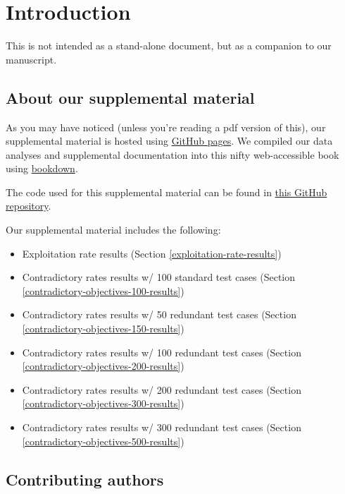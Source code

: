 \documentclass[
]{book}
\providecommand{\tightlist}{%
  \setlength{\itemsep}{0pt}\setlength{\parskip}{0pt}}
\begin{document}
\hypertarget{introduction}{%
\chapter{Introduction}\label{introduction}}

This is not intended as a stand-alone document, but as a companion to our manuscript.

\hypertarget{about-our-supplemental-material}{%
\section{About our supplemental material}\label{about-our-supplemental-material}}

As you may have noticed (unless you're reading a pdf version of this), our supplemental material is hosted using \href{https://pages.github.com/}{GitHub pages}.
We compiled our data analyses and supplemental documentation into this nifty web-accessible book using \href{https://bookdown.org}{bookdown}.

The code used for this supplemental material can be found in \href{https://github.com/jgh9094/GPTP-2024-Lexicase-Analysis}{this GitHub repository}.

Our supplemental material includes the following:

\begin{itemize}
\tightlist
\item
  Exploitation rate results (Section \ref{exploitation-rate-results})
\item
  Contradictory rates results w/ 100 standard test cases (Section \ref{contradictory-objectives-100-results})
\item
  Contradictory rates results w/ 50 redundant test cases (Section \ref{contradictory-objectives-150-results})
\item
  Contradictory rates results w/ 100 redundant test cases (Section \ref{contradictory-objectives-200-results})
\item
  Contradictory rates results w/ 200 redundant test cases (Section \ref{contradictory-objectives-300-results})
\item
  Contradictory rates results w/ 300 redundant test cases (Section \ref{contradictory-objectives-500-results})
\end{itemize}

\hypertarget{contributing-authors}{%
\section{Contributing authors}\label{contributing-authors}}
\end{document}
